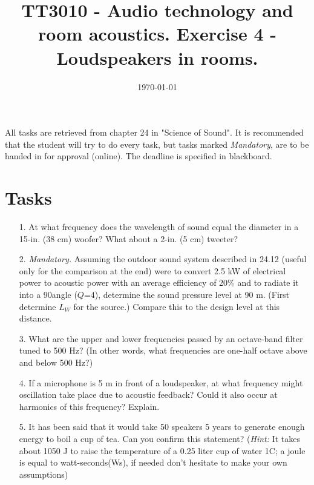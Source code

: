 \documentclass{article}
\title{TT3010 - Audio technology and room acoustics. \newline Exercise 4 - Loudspeakers in rooms.}
\date{\today}
\begin{document}
\maketitle

All tasks are retrieved from chapter 24 in  "Science of Sound". It is recommended that the student will try to do every task, but tasks marked \textit{Mandatory}, are to be handed in for approval (online). The deadline is specified in blackboard.

\section*{Tasks}
\begin{itemize}
    \item [1.] At what frequency does the wavelength of sound equal the diameter in a 15-in. (38 cm) woofer? What about a 2-in. (5 cm) tweeter?
        
    \item[2.] \textit{Mandatory.} Assuming the outdoor sound system described in 24.12 (useful only for the comparison at the end) were to convert 2.5 kW of electrical power to acoustic power with an average efficiency of 20\% and to radiate it into a 90\degree angle ($Q$=4), determine the sound pressure level at 90 m. (First determine $L_W$ for the source.) Compare this to the design level at this distance.
        
    \item[3.] What are the upper and lower frequencies passed by an octave-band filter tuned to 500 Hz? (In other words, what frequencies are one-half octave above and below 500 Hz?)
    
    
    
    \item[4.] If a microphone is 5 m in front of a loudspeaker, at what frequency might oscillation take place due to acoustic feedback? Could it also occur at harmonics of this frequency? Explain.
        
    \item[5.] It has been said that it would take 50 speakers 5 years to generate enough energy to boil a cup of tea. Can you confirm this statement? (\textit{Hint:} It takes about 1050 J to raise the temperature of a 0.25 liter cup of water 1\degree C; a joule is equal to watt-seconds(Ws), if needed don't hesitate to make your own assumptions)


\end{itemize}
\end{document}
